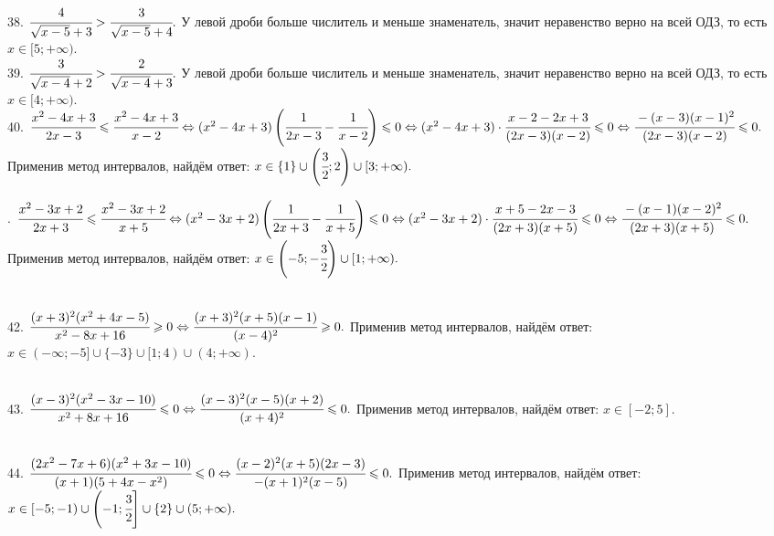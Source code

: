 38. $\cfrac{4}{\sqrt{x-5}+3}>\cfrac{3}{\sqrt{x-5}+4}.$ У левой дроби больше числитель и меньше знаменатель, значит неравенство верно на всей ОДЗ, то есть $x\in[5;+\infty).$\\
39. $\cfrac{3}{\sqrt{x-4}+2}>\cfrac{2}{\sqrt{x-4}+3}.$ У левой дроби больше числитель и меньше знаменатель, значит неравенство верно на всей ОДЗ, то есть $x\in[4;+\infty).$\\
40. $\cfrac{x^2-4x+3}{2x-3}\leqslant\cfrac{x^2-4x+3}{x-2}\Leftrightarrow (x^2-4x+3)\left(\cfrac{1}{2x-3}-\cfrac{1}{x-2}\right)\leqslant0
\Leftrightarrow (x^2-4x+3)\cdot\cfrac{x-2-2x+3}{(2x-3)(x-2)}\leqslant0\Leftrightarrow\cfrac{-(x-3)(x-1)^2}{(2x-3)(x-2)}\leqslant0.$ Применив метод интервалов, найдём ответ: $x\in\{1\}\cup\left(\cfrac{3}{2};2\right)\cup[3;+\infty).$
\begin{figure}[ht!]
\end{figure}\newpage{}. $\cfrac{x^2-3x+2}{2x+3}\leqslant\cfrac{x^2-3x+2}{x+5}\Leftrightarrow (x^2-3x+2)\left(\cfrac{1}{2x+3}-\cfrac{1}{x+5}\right)\leqslant0
\Leftrightarrow (x^2-3x+2)\cdot\cfrac{x+5-2x-3}{(2x+3)(x+5)}\leqslant0\Leftrightarrow\cfrac{-(x-1)(x-2)^2}{(2x+3)(x+5)}\leqslant0.$ Применив метод интервалов, найдём ответ: $x\in\left(-5;-\cfrac{3}{2}\right)\cup[1;+\infty).$
\begin{figure}[ht!]
\end{figure}\\
42. $\cfrac{(x+3)^2(x^2+4x-5)}{x^2-8x+16}\geqslant0\Leftrightarrow\cfrac{(x+3)^2(x+5)(x-1)}{(x-4)^2}\geqslant0.$ Применив метод интервалов, найдём ответ: $x\in(-\infty;-5]\cup\{-3\}\cup[1;4)\cup(4;+\infty).$
\begin{figure}[ht!]
\end{figure}\\
43. $\cfrac{(x-3)^2(x^2-3x-10)}{x^2+8x+16}\leqslant0\Leftrightarrow\cfrac{(x-3)^2(x-5)(x+2)}{(x+4)^2}\leqslant0.$ Применив метод интервалов, найдём ответ: $x\in[-2;5].$
\begin{figure}[ht!]
\end{figure}\\
44. $\cfrac{(2x^2-7x+6)(x^2+3x-10)}{(x+1)(5+4x-x^2)}\leqslant0\Leftrightarrow\cfrac{(x-2)^2(x+5)(2x-3)}{-(x+1)^2(x-5)}\leqslant0.$ Применив метод интервалов, найдём ответ: $x\in[-5;-1)\cup\left(-1;\cfrac{3}{2}\right]\cup\{2\}\cup(5;+\infty).$
\begin{figure}[ht!]
\end{figure}\newpage\noindent
